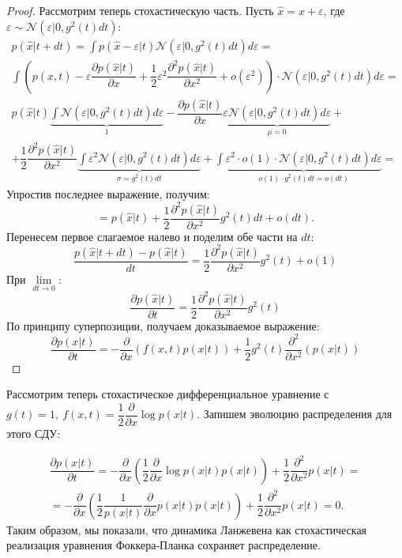 \begin{proof}
    Рассмотрим теперь стохастическую часть. Пусть $\hat{x} = x + \varepsilon$, где $\varepsilon \sim \mathcal{N}(\varepsilon| 0, g^2(t) dt)$:
    \[
        \begin{array}{c}
        \displaystyle p(\hat{x} | t+dt) = \int p(\hat{x} - \varepsilon| t) \mathcal{N}(\varepsilon | 0, g^2(t)dt) d\varepsilon = \\[0.5cm]
        \displaystyle \int \left(p(\hat{x}, t) - \varepsilon \dfrac{\partial p(\hat{x} | t)}{\partial x} + \dfrac{1}{2} \varepsilon^2 \dfrac{\partial^2 p(\hat{x} |t)}{\partial x^2} + o(\varepsilon^2)\right) \cdot \mathcal{N}(\varepsilon| 0, g^2(t)dt)d\varepsilon = \\[0.5cm]
        \displaystyle p(\hat{x} | t) \underbrace{\int \mathcal{N}(\varepsilon| 0, g^2(t)dt)d\varepsilon}_{1} - \dfrac{\partial p(\hat{x} | t)}{\partial x} \underbrace{\varepsilon\mathcal{N}(\varepsilon| 0, g^2(t)dt)d\varepsilon}_{\mu = 0} + \\[0.5cm] 
        \displaystyle + \dfrac{1}{2} \dfrac{\partial^2 p(\hat{x} | t)}{\partial x^2} \underbrace{\int \varepsilon^2 \mathcal{N}(\varepsilon| 0, g^2(t)dt) d\varepsilon}_{\sigma = g^2(t) dt} + \int \underbrace{\varepsilon^2 \cdot o(1) \cdot \mathcal{N}(\varepsilon| 0, g^2(t)dt) d\varepsilon}_{o(1) \cdot g^2(t) dt = o(dt)} =
        \end{array}
    \]
    Упростив последнее выражение, получим:
    \[
        = p(\hat{x}|t) + \dfrac{1}{2} \dfrac{\partial^2 p(\hat{x} |t)}{\partial x^2} g^2(t) dt + o(dt).
    \]
    Перенесем первое слагаемое налево и поделим обе части на $dt$:
    \[
        \dfrac{p(\hat{x} | t + dt) - p(\hat{x} | t)}{dt} = \dfrac{1}{2}\dfrac{\partial^2 p(\hat{x} | t)}{\partial x^2} g^2(t) + o(1)
    \]
    При $\lim\limits_{dt \to 0}$:
    \[
       \dfrac{\partial p(\hat{x} | t)}{\partial t} = \dfrac{1}{2} \dfrac{\partial^2 p(\hat{x} | t)}{\partial x^2} g^2(t)
    \]
    По принципу суперпозиции, получаем доказываемое выражение: 
    \[
        \dfrac{\partial p(x|t)}{\partial t} = -\dfrac{\partial }{\partial x} \left(f\left(x,t\right)p(x|t) \right) + \dfrac{1}{2}g^2 (t) \dfrac{\partial^2}{\partial x^2} \left(p(x|t)\right)
    \]
\end{proof}

Рассмотрим теперь стохастическое дифференциальное уравнение с $g(t) = 1,\ f(x, t) = \dfrac{1}{2} \dfrac{\partial }{\partial x} \log p(x| t)$. Запишем эволюцию распределения для этого СДУ:

\[
    \begin{array}{c}
        \dfrac{\partial p(x| t)}{\partial t} = -\dfrac{\partial}{\partial x} \left(\dfrac{1}{2} \dfrac{\partial }{\partial x} \log p(x | t) p(x|t)\right) + \dfrac{1}{2} \dfrac{\partial^2}{\partial x^2} p(x | t) = \\[0.5cm] 
        = -\dfrac{\partial }{\partial x} \left(\dfrac{1}{2} \dfrac{1}{p(x|t)} \dfrac{\partial}{\partial x} p(x|t) p(x|t)\right) + \dfrac{1}{2} \dfrac{\partial^2}{\partial x^2} p(x|t) = 0.
    \end{array}
\]
Таким образом, мы показали, что динамика Ланжевена как стохастическая реализация уравнения Фоккера-Планка сохраняет распределение.


